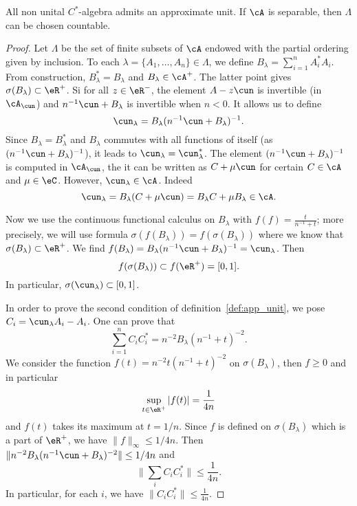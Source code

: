 \begin{proposition}
	All non unital $C^*$-algebra admits an approximate unit. If $\cA$ is separable, then $\Lambda$ can be chosen countable.
\end{proposition}

\begin{proof}
	Let $\Lambda$ be the set of finite subsets of $\cA$ endowed with the partial ordering given by inclusion. To each $\lambda=\{ A_1,\ldots,A_n \}\in\Lambda$, we define $B_{\lambda}=\sum_{i=1}^nA_i^*A_i$. From construction, $B_{\lambda}^*=B_{\lambda}$ and $B_{\lambda}\in\cA^+$. The latter point gives $\sigma(B_{\lambda})\subset\eR^+$. Si for all $z\in\eR^-$, the element $A-z\cun$ is invertible (in $\cA_{\cun}$) and $n^{-1}\cun+B_{\lambda}$ is invertible when $n<0$. It allows us to define
	\[
		\cun_{\lambda}=B_{\lambda}(n^{-1}\cun+B_{\lambda})^{-1}.
	\]
	Since $B_{\lambda}=B_{\lambda}^*$ and $B_{\lambda}$ commutes with all functions of itself (as $(n^{-1}\cun+B_{\lambda})^{-1}$), it leads to $\cun_{\lambda}=\cun_{\lambda}^*$. The element $(n^{-1}\cun+B_{\lambda})^{-1}$ is computed in $\cA_{\cun}$, the it can be written as $C+\mu\cun$ for certain $C\in\cA$ and $\mu\in\eC$. However, $\cun_{\lambda}\in\cA$. Indeed
	\[
		\cun_{\lambda}=B_{\lambda}(C+\mu\cun)=B_{\lambda}C+\mu B_{\lambda}\in\cA.
	\]

	Now we use the continuous functional calculus on $B_{\lambda}$ with $f(f)=\frac{t}{n^{-1}+t}$; more precisely, we will use formula $\sigma(f(B_{\lambda}))=f(\sigma(B_{\lambda}))$ where we know that $\sigma(B_{\lambda})\subset\eR^+$. We find $f(B_{\lambda})=B_{\lambda}(n^{-1}\cun+B_{\lambda})^{-1}=\cun_{\lambda}$. Then
	\[
		f(\sigma(B_{\lambda}))\subset f(\eR^+)=[0,1].
	\]
	In particular, $\sigma(\cun_{\lambda})\subset[0,1]$.

	In order to prove the second condition of definition~\ref{def:app_unit}, we pose $C_i=\cun_{\lambda} A_i-A_i$. One can prove that 
	\[
		\sum_{i=1}^n C_iC_i^*=n^{-2}B_{\lambda}(n^{-1}+t)^{-2}.
	\]
	We consider the function $f(t)=n^{-2}t(n^{-1}+t)^{-2}$ on $\sigma(B_{\lambda})$, then $f\geq 0$ and in particular
	\[
		\sup_{t\in\eR^+}| f(t) |=\frac{1}{4n}
	\]
	and $f(t)$ takes its maximum at $t=1/n$. Since $f$ is defined on $\sigma(B_{\lambda})$ which is a part of $\eR^+$, we have $\| f \|_{\infty}\leq 1/4n$. Then $\| n^{-2}B_{\lambda}(n^{-1}\cun+B_{\lambda})^{-2} \|\leq 1/4n$ and
	\[
		\| \sum_i C_iC_i^* \|\leq\frac{1}{4n}.
	\]
	In particular, for each $i$, we have $\| C_iC_i^* \|\leq \frac{1}{4n}$.


\end{proof}
